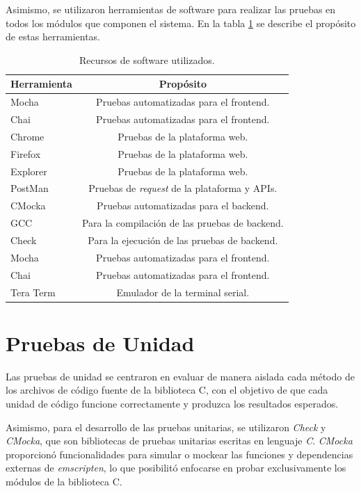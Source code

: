 Asimismo, se utilizaron herramientas de software para realizar las pruebas
en todos los módulos que componen el sistema. En la tabla \ref{tab:RecursosSoftware} se describe el propósito de estas herramientas.

\hfill \break
\hfill \break
\hfill \break
\hfill \break

\begin{table}[h]
	\centering
	\caption[Recursos de software utilizados]{Recursos de software utilizados.}
	\begin{tabular}{l c}    
		\toprule
		\textbf{Herramienta} & \textbf{Propósito}\\
		\midrule
		Mocha &  Pruebas automatizadas para el frontend.\\		
		Chai &   Pruebas automatizadas para el frontend.\\
		Chrome & Pruebas de la plataforma web.\\
		Firefox & Pruebas de la plataforma web.\\
		Explorer &  Pruebas de la plataforma web. \\
		PostMan \citep{Postman} &  Pruebas de \textit{request} de la plataforma y APIs. \\
		CMocka &  Pruebas automatizadas para el backend. \\
		GCC  & Para la compilación de las pruebas de backend. \\
		Check  & Para la ejecución de las pruebas de backend. \\
		Mocha  &  Pruebas automatizadas para el frontend. \\
		Chai  &  Pruebas automatizadas para el frontend. \\
        Tera Term \citep{TeraTerm} &  Emulador de la terminal serial. \\
		\bottomrule
		\hline
	\end{tabular}
	\label{tab:RecursosSoftware}
\end{table}

\section{Pruebas de Unidad} 
\label{subsec:Pruebas de Unidad}  

Las pruebas de unidad se centraron en evaluar de manera aislada cada método de los archivos de código fuente de la biblioteca C, con el objetivo de que cada unidad de código funcione correctamente y produzca los resultados esperados. 

Asimismo, para el desarrollo de las pruebas unitarias, se utilizaron \textit{Check} y \textit{CMocka}, que son bibliotecas de pruebas unitarias escritas en lenguaje \textit{C}. \textit{CMocka} proporcionó funcionalidades para simular o mockear las funciones y dependencias externas de \textit{emscripten}, lo que posibilitó enfocarse en probar exclusivamente los módulos de la biblioteca C.

